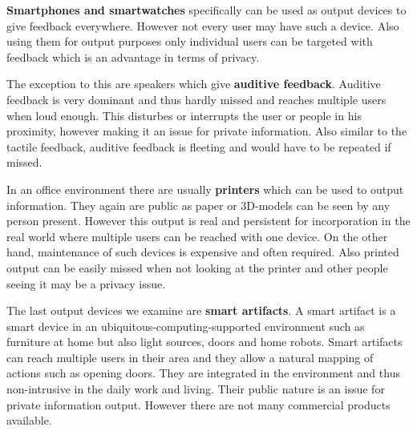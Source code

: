 \textbf{Smartphones and smartwatches} specifically can be used as output devices to give feedback everywhere.
However not every user may have such a device.
Also using them for output purposes only individual users can be targeted with feedback which is an advantage in terms of privacy.

The exception to this are speakers which give \textbf{auditive feedback}.
Auditive feedback is very dominant and thus hardly missed and reaches multiple users when loud enough.
This disturbes or interrupts the user or people in his proximity, however making it an issue for private information.
Also similar to the tactile feedback, auditive feedback is fleeting and would have to be repeated if missed.

In an office environment there are usually \textbf{printers} which can be used to output information.
They again are public as paper or 3D-models can be seen by any person present.
However this output is real and persistent for incorporation in the real world where multiple users can be reached with one device.
On the other hand, maintenance of such devices is expensive and often required.
Also printed output can be easily missed when not looking at the printer and other people seeing it may be a privacy issue.

The last output devices we examine are \textbf{smart artifacts}.
A smart artifact is a smart device in an ubiquitous-computing-supported environment such as furniture at home but also light sources, doors and home robots.
Smart artifacts can reach multiple users in their area and they allow a natural mapping of actions such as opening doors.
They are integrated in the environment and thus non-intrusive in the daily work and living.
Their public nature is an issue for private information output.
However there are not many commercial products available.
